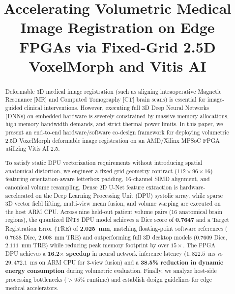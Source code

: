 \documentclass[conference]{IEEEtran}
\begin{document}
\title{Accelerating Volumetric Medical Image Registration on Edge FPGAs via Fixed-Grid 2.5D VoxelMorph and Vitis AI}

\author{
}

\maketitle

\begin{abstract}
Deformable 3D medical image registration (such as aligning intraoperative Magnetic Resonance [MR] and Computed Tomography [CT] brain scans) is essential for image-guided clinical interventions. However, executing full 3D Deep Neural Networks (DNNs) on embedded hardware is severely constrained by massive memory allocations, high memory bandwidth demands, and strict thermal power limits. In this paper, we present an end-to-end hardware/software co-design framework for deploying volumetric 2.5D VoxelMorph deformable image registration on an AMD/Xilinx MPSoC FPGA utilizing Vitis AI 2.5.

To satisfy static DPU vectorization requirements without introducing spatial anatomical distortion, we engineer a fixed-grid geometry contract ($112 \times 96 \times 16$) featuring orientation-aware letterbox padding, 16-channel SIMD alignment, and canonical volume resampling. Dense 2D U-Net feature extraction is hardware-accelerated on the Deep Learning Processing Unit (DPU) systolic array, while sparse 3D vector field lifting, multi-view mean fusion, and volume warping are executed on the host ARM CPU. Across nine held-out patient volume pairs (16 anatomical brain regions), the quantized INT8 DPU model achieves a Dice score of \textbf{0.7647} and a Target Registration Error (TRE) of \textbf{2.025~mm}, matching floating-point software references ($0.7638$ Dice, $2.008$~mm TRE) and outperforming full 3D desktop models ($0.7609$ Dice, $2.111$~mm TRE) while reducing peak memory footprint by over $15\times$. The FPGA DPU achieves a \textbf{16.2$\times$ speedup} in neural network inference latency ($1,822.5$~ms vs $29,472.1$~ms on ARM CPU for 3-view fusion) and a \textbf{38.5\% reduction in dynamic energy consumption} during volumetric evaluation. Finally, we analyze host-side processing bottlenecks ($>95\%$ runtime) and establish design guidelines for edge medical accelerators.
\end{abstract}
\end{document}
